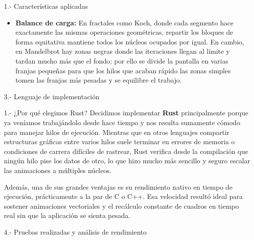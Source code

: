 \begin{respuesta}{1.- Características aplicadas}
\begin{itemize}
        \item \textbf{Balance de carga:} En fractales como Koch, donde cada segmento hace exactamente las mismas operaciones geométricas, repartir los bloques de forma equitativa mantiene todos los núcleos ocupados por igual. En cambio, en Mandelbrot hay zonas negras donde las iteraciones llegan al límite y tardan mucho más que el fondo; por ello se divide la pantalla en varias franjas pequeñas para que los hilos que acaban rápido las zonas simples tomen las franjas más pesadas y se equilibre el trabajo.
    \end{itemize}
\end{respuesta}

\begin{ejercicio}{3.- Lenguaje de implementación}
\end{ejercicio}

\begin{respuesta}{1.- ¿Por qué elegimos Rust?}
    Decidimos implementar \textbf{Rust} principalmente porque ya veníamos trabajándolo desde hace tiempo y nos resulta sumamente cómodo para manejar hilos de ejecución. Mientras que en otros lenguajes compartir estructuras gráficas entre varios hilos suele terminar en errores de memoria o condiciones de carrera difíciles de rastrear, Rust verifica desde la compilación que ningún hilo pise los datos de otro, lo que hizo mucho más sencillo y seguro escalar las animaciones a múltiples núcleos.

    Además, una de sus grandes ventajas es su rendimiento nativo en tiempo de ejecución, prácticamente a la par de C o C++. Esa velocidad resultó ideal para sostener animaciones vectoriales y el recálculo constante de cuadros en tiempo real sin que la aplicación se sienta pesada.
\end{respuesta}

\begin{ejercicio}{4.- Pruebas realizadas y análisis de rendimiento}
\end{ejercicio}

